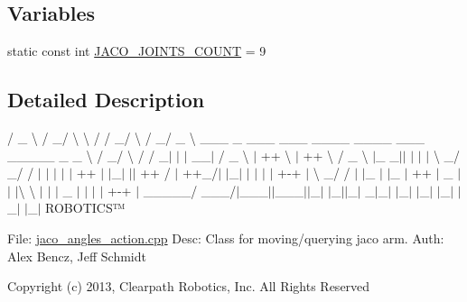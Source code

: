 \subsection*{Variables}
\begin{DoxyCompactItemize}
\item 
static const int \hyperlink{namespacejaco_a842fe600d7cc8aba974c8e39e0d88399}{J\+A\+C\+O\+\_\+\+J\+O\+I\+N\+T\+S\+\_\+\+C\+O\+U\+NT} = 9
\end{DoxyCompactItemize}


\subsection{Detailed Description}


 / \+\_\+ \textbackslash{} / \+\_\+/ \textbackslash{} \textbackslash{} / / \+\_\+/ \textbackslash{} / \+\_\+/ \+\_\+ \textbackslash{} \+\_\+\+\_\+\+\_\+ \+\_\+ \+\_\+\+\_\+\+\_\+ \+\_\+\+\_\+\+\_\+ \+\_\+\+\_\+\+\_\+\+\_\+ \+\_\+\+\_\+\+\_\+\+\_\+ \+\_\+\+\_\+\+\_\+ \+\_\+\+\_\+\+\_\+\+\_\+\+\_\+ \+\_\+ \+\_\+ \textbackslash{} / \+\_\+/ \textbackslash{} / / \+\_\+$|$ $\vert$ $\vert$ \+\_\+\+\_\+$\vert$ / \+\_\+ \textbackslash{} $\vert$ ++ \textbackslash{} $\vert$ ++ \textbackslash{} / \+\_\+ \textbackslash{} $\vert$\+\_\+ \+\_\+$\vert$$\vert$ $\vert$ $\vert$ $\vert$ \textbackslash{} \+\_\+/ \+\_\+/ / $\vert$ $\vert$ $\vert$ $\vert$ $\vert$ ++ $\vert$ $\vert$\+\_\+$\vert$ $\vert$$\vert$ ++ / $\vert$ ++\+\_\+/$\vert$ $\vert$\+\_\+$\vert$ $\vert$ $\vert$ $\vert$ $\vert$ +-\/+ $\vert$ \textbackslash{} \+\_\+/ / $\vert$ $\vert$\+\_\+ $\vert$ $\vert$\+\_\+ $\vert$ ++ $\vert$ \+\_\+ $\vert$$\vert$ $\vert$\textbackslash{} \textbackslash{} $\vert$ $\vert$ $\vert$ \+\_\+ $\vert$ $\vert$ $\vert$ $\vert$ +-\/+ $\vert$ \+\_\+\+\_\+\+\_\+\+\_\+\+\_\+/ \+\_\+\+\_\+\+\_\+/$\vert$\+\_\+\+\_\+\+\_\+$\vert$$\vert$\+\_\+\+\_\+\+\_\+$\vert$$\vert$\+\_\+$\vert$ $\vert$\+\_\+$\vert$$\vert$\+\_\+$\vert$ \+\_\+$|$\+\_\+$\vert$ $\vert$\+\_\+$\vert$ $\vert$\+\_\+$\vert$ $\vert$\+\_\+$\vert$ $\vert$\+\_\+$\vert$ $\vert$\+\_\+$\vert$ R\+O\+B\+O\+T\+I\+C\+S™

File\+: \hyperlink{jaco__angles__action_8cpp}{jaco\+\_\+angles\+\_\+action.\+cpp} Desc\+: Class for moving/querying jaco arm. Auth\+: Alex Bencz, Jeff Schmidt

Copyright (c) 2013, Clearpath Robotics, Inc. All Rights Reserved


